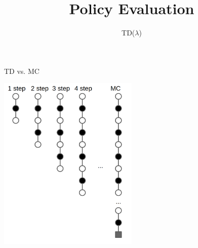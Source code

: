 


\title[Reinforcement Learning: Policy Evaluation]{Policy Evaluation}
\subtitle{TD($\lambda$)}




	
	\maketitle


\begin{frame}[c]{TD vs. MC}

	\centering
	\includegraphics[width=0.5\textwidth]{images/td_vs_mc}
	
	
\end{frame}
